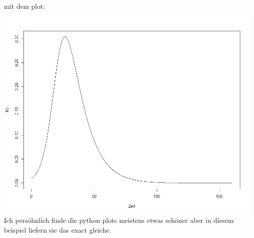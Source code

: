 \documentclass{scrartcl}
\begin{document}
mit dem plot:\\
\includegraphics*[scale=0.5]{Sir_modell_R.png}\\
Ich persöhnlich finde die python plots meistens etwas schöner aber in diesem beispiel liefern sie das exact gleiche.
\end{document}
